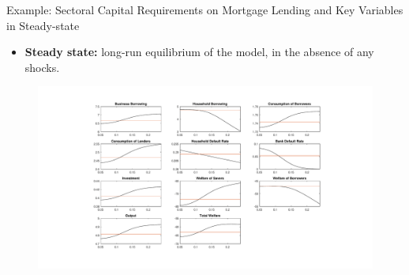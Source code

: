 \documentclass[8pt,aspectratio=169]{beamer}
\numberwithin{equation}{section}
\begin{document}
\begin{frame}{Example: Sectoral Capital Requirements on Mortgage Lending and Key Variables in Steady-state}

\begin{itemize}
\item \textbf{Steady state:} long-run equilibrium of the model, in the absence of any shocks. 
\end{itemize}

\begin{figure}[H]
\centering
\includegraphics[scale=0.3]{WA_SCR_housing_level.pdf}\\

\end{figure}

\end{frame}




\end{document}
